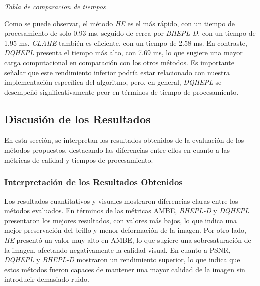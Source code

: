 \documentclass[sigchi]{acmart}
\begin{document}
\begin{table}[H]
	\caption{Comparación de tiempos de procesamiento}
	\label{tab:comparacion_tiempos}
	\small

	\vspace{0.5em}
	\footnotesize%
	\textit{Tabla de comparacion de tiempos}
\end{table}

Como se puede observar, el método \emph{HE} es el más rápido, con un tiempo de procesamiento
de solo 0.93 ms, seguido de cerca por \emph{BHEPL-D}, con un tiempo de 1.95 ms.
\emph{CLAHE} también es eficiente, con un tiempo de 2.58 ms. En contraste, \emph{DQHEPL}
presenta el tiempo más alto, con 7.69 ms, lo que sugiere una mayor carga computacional en
comparación con los otros métodos. Es importante señalar que este rendimiento inferior podría
estar relacionado con nuestra implementación específica del algoritmo, pero, en general,
\emph{DQHEPL} se desempeñó significativamente peor en términos de tiempo de procesamiento.


\subsection{Discusión de los Resultados} \label{subsec:discusion}

En esta sección, se interpretan los resultados obtenidos de la evaluación de los métodos
propuestos, destacando las diferencias entre ellos en cuanto a las métricas de calidad y
tiempos de procesamiento.

\subsubsection{\textbf{Interpretación de los Resultados Obtenidos}}

Los resultados cuantitativos y visuales mostraron diferencias claras entre los métodos
evaluados. En términos de las métricas AMBE, \emph{BHEPL-D} y \emph{DQHEPL} presentaron los
mejores resultados, con valores más bajos, lo que indica una mejor preservación del brillo y
menor deformación de la imagen. Por otro lado, \emph{HE} presentó un valor muy alto en AMBE,
lo que sugiere una sobresaturación de la imagen, afectando negativamente la calidad visual. En
cuanto a PSNR, \emph{DQHEPL} y \emph{BHEPL-D} mostraron un rendimiento superior, lo que
indica que estos métodos fueron capaces de mantener una mayor calidad de la imagen sin
introducir demasiado ruido.
\end{document}
